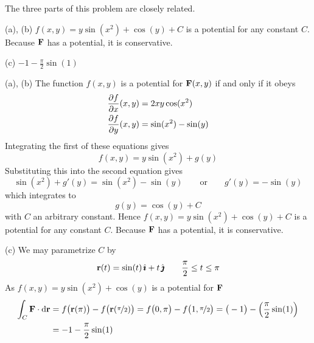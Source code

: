 \begin{hint} 
The three parts of this problem are closely related.
\end{hint}

\begin{answer} 
(a), (b)  $f(x,y) = y\sin(x^2)+\cos(y) + C$  
is a potential for any constant $C$. Because $\mathbf{F}$ has a potential,
it is conservative.

(c) $-1 -\frac{\pi}{2}\sin(1)$
\end{answer}

\begin{solution} (a), (b) 
The function $f(x,y)$ is a potential for $\mathbf{F}(x,y)$
if and only if it obeys
\begin{align*}
\pdiff{f}{x}(x,y) 
            &= 2xy \cos(x^2) \\
\pdiff{f}{y}(x,y) &= \sin(x^2) - \sin(y)
\end{align*}
Integrating the first of these equations gives
\begin{equation*}
f(x,y) = y\sin(x^2) + g(y)
\end{equation*}
Substituting this into the second equation gives 
\begin{equation*}
\sin(x^2)+g'(y) = \sin(x^2) - \sin(y)
\qquad\text{or}\qquad
g'(y) = -\sin(y)
\end{equation*}
which integrates to
\begin{equation*}
g(y) = \cos(y) + C
\end{equation*}
with $C$ an arbitrary constant. Hence $f(x,y) = y\sin(x^2)+\cos(y) + C$  
is a potential for any constant $C$. Because $\mathbf{F}$ has a potential,
it is conservative.

(c) We may parametrize $C$ by
\begin{equation*}
\mathbf{r}(t) = \sin(t)\,\hat{\pmb{\imath}} + t\,\hat{\pmb{\jmath}}\qquad
\frac{\pi}{2}\le t\le\pi
\end{equation*}
As $f(x,y) = y\sin(x^2)+\cos(y)$ is a potential for $\mathbf{F}$
\begin{align*}
\int_C\mathbf{F}\cdot\mathrm{d}\mathbf{r}
&=f\big(\mathbf{r}(\pi)\big) -f\big(\mathbf{r}(\nicefrac{\pi}{2})\big)
=f\big(0,\pi\big) -f\big(1,\nicefrac{\pi}{2}\big)
=\big(-1\big)-\Big(\frac{\pi}{2}\sin(1)\Big) \\
&=-1 -\frac{\pi}{2}\sin(1)
\end{align*}
\end{solution}



